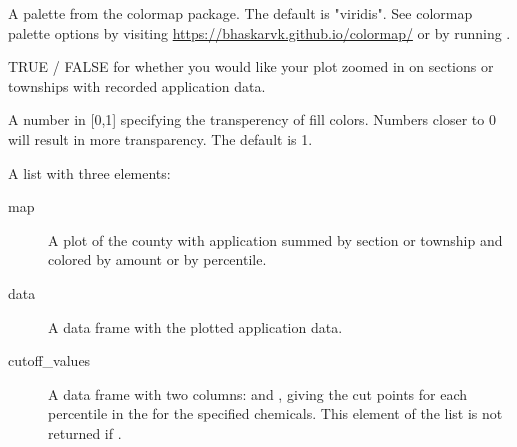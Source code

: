 \documentclass[a4paper]{book}
\begin{document}
\begin{Arguments}
\begin{ldescription}
\item[\code{fill\_option}] A palette from the colormap package. The default is
"viridis". See colormap palette options by visiting
\url{https://bhaskarvk.github.io/colormap/} or by running
.

\item[\code{crop}] TRUE / FALSE for whether you would like your plot zoomed in on
sections or townships with recorded application data.

\item[\code{alpha}] A number in [0,1] specifying the transperency of fill colors.
Numbers closer to 0 will result in more transparency. The default is 1.
\end{ldescription}
\end{Arguments}
%
\begin{Value}
A list with three elements:
\begin{description}

\item[map] A plot of the county with application summed by section or
township and colored by amount or by percentile.
\item[data] A data frame with the plotted application data.
\item[cutoff\_values] A data frame with two columns: 
and , giving the cut points for each percentile in the
 for the specified chemicals. This element of the list
is not returned if .

\end{description}

\end{Value}
%
\end{document}

